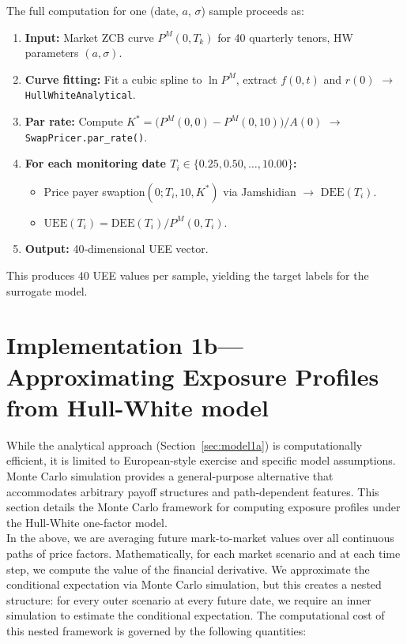     The full computation for one (date, $a$, $\sigma$) sample proceeds as:
    \begin{enumerate}
        \item \textbf{Input:} Market ZCB curve $P^M(0,T_k)$ for 40 quarterly tenors, HW parameters $(a,\sigma)$.
        \item \textbf{Curve fitting:} Fit a cubic spline to $\ln P^M$, extract $f(0,t)$ and $r(0)$ $\rightarrow$ \texttt{HullWhiteAnalytical}.
        \item \textbf{Par rate:} Compute $K^* = \bigl(P^M(0,0) - P^M(0,10)\bigr) / A(0)$ $\rightarrow$ \texttt{SwapPricer.par\_rate()}.
        \item \textbf{For each monitoring date $T_i \in \{0.25, 0.50, \dots, 10.00\}$:}
            \begin{itemize}
                \item Price payer swaption$(0; T_i, 10, K^*)$ via Jamshidian $\rightarrow$ $\text{DEE}(T_i)$.
                \item $\text{UEE}(T_i) = \text{DEE}(T_i) / P^M(0,T_i)$.
            \end{itemize}
        \item \textbf{Output:} 40‑dimensional UEE vector.
    \end{enumerate}
    This produces 40 UEE values per sample, yielding the target labels for the surrogate model.

    

\newpage
\section{Implementation 1b—Approximating Exposure Profiles from Hull-White model}\label{sec:model1b}
    While the analytical approach (Section~\ref{sec:model1a}) is computationally efficient, it is limited to European-style exercise and specific model assumptions. Monte Carlo simulation provides a general-purpose alternative that accommodates arbitrary payoff structures and path-dependent features. This section details the Monte Carlo framework for computing exposure profiles under the Hull-White one-factor model.\\
      \noindent
  In the above, we are averaging future mark-to-market values over all continuous paths of price factors. Mathematically, for each market scenario and at each time step, we compute the value of the financial derivative. We approximate the conditional expectation via Monte Carlo simulation, but this creates a nested structure: for every outer scenario at every future date, we require an inner simulation to estimate the conditional expectation. The computational cost of this nested framework is governed by the following quantities:
 
